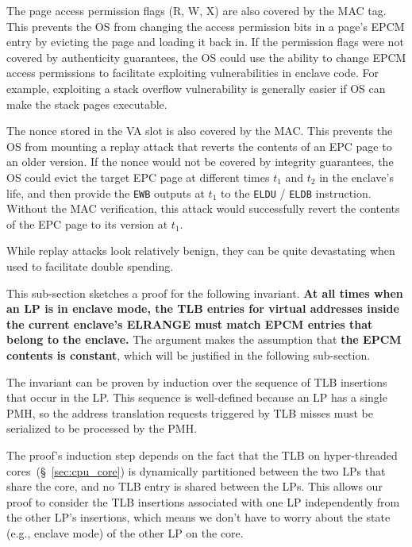 The page access permission flags (R, W, X) are also covered by the MAC tag.
This prevents the OS from changing the access permission bits in a page's EPCM
entry by evicting the page and loading it back in. If the permission flags were
not covered by authenticity guarantees, the OS could use the ability to change
EPCM access permissions to facilitate exploiting vulnerabilities in enclave
code. For example, exploiting a stack overflow vulnerability is generally
easier if OS can make the stack pages executable.

The nonce stored in the VA slot is also covered by the MAC. This prevents the
OS from mounting a replay attack that reverts the contents of an EPC page to an
older version. If the nonce would not be covered by integrity guarantees, the
OS could evict the target EPC page at different times $t_1$ and $t_2$ in the
enclave's life, and then provide the \texttt{EWB} outputs at $t_1$ to the
\texttt{ELDU} / \texttt{ELDB} instruction. Without the MAC verification, this
attack would successfully revert the contents of the EPC page to its version
at $t_1$.

While replay attacks look relatively benign, they can be quite devastating when
used to facilitate double spending.



This sub-section sketches a proof for the following invariant. \textbf{At all
times when an LP is in enclave mode, the TLB entries for virtual addresses
inside the current  enclave's ELRANGE must match EPCM entries that belong to
the enclave.} The argument makes the assumption that \textbf{the EPCM contents
is constant}, which will be justified in the following sub-section.

The invariant can be proven by induction over the sequence of TLB insertions
that occur in the LP. This sequence is well-defined because an LP has a single
PMH, so the address translation requests triggered by TLB misses must be
serialized to be processed by the PMH.

The proof's induction step depends on the fact that the TLB on hyper-threaded
cores~(\S~\ref{sec:cpu_core}) is dynamically partitioned between the two LPs
that share the core, and no TLB entry is shared between the LPs. This allows
our proof to consider the TLB insertions associated with one LP independently
from the other LP's insertions, which means we don't have to worry about the
state (e.g., enclave mode) of the other LP on the core.

